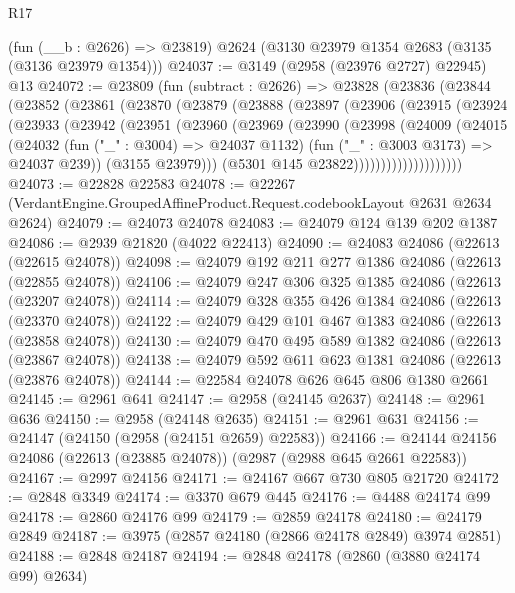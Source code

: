 \begin{lexlean}{R17}
\begin{coremodule}
    (fun (__b : @2626) => @23819)
    @2624
    (@3130 @23979 @1354 @2683 (@3135 (@3136 @23979 @1354)))
@24037 := @3149 (@2958 (@23976 @2727) @22945) @13
@24072 := @23809
    (fun (subtract : @2626) =>
    @23828
      (@23836
        (@23844
          (@23852
            (@23861
              (@23870
                (@23879
                  (@23888
                    (@23897
                      (@23906
                        (@23915
                          (@23924
                            (@23933
                              (@23942
                                (@23951
                                  (@23960
                                    (@23969
                                      (@23990
                                        (@23998
                                          (@24009
                                            (@24015
                                              (@24032
                                                (fun ("_" : @3004) => @24037 @1132)
                                                (fun ("_" : @3003 @3173) => @24037 @239))
                                              (@3155 @23979)))
                                          (@5301 @145 @23822))))))))))))))))))))
@24073 := @22828 @22583
@24078 := @22267 (VerdantEngine.GroupedAffineProduct.Request.codebookLayout @2631 @2634 @2624)
@24079 := @24073 @24078
@24083 := @24079 @124 @139 @202 @1387
@24086 := @2939 @21820 (@4022 @22413)
@24090 := @24083 @24086 (@22613 (@22615 @24078))
@24098 := @24079 @192 @211 @277 @1386 @24086 (@22613 (@22855 @24078))
@24106 := @24079 @247 @306 @325 @1385 @24086 (@22613 (@23207 @24078))
@24114 := @24079 @328 @355 @426 @1384 @24086 (@22613 (@23370 @24078))
@24122 := @24079 @429 @101 @467 @1383 @24086 (@22613 (@23858 @24078))
@24130 := @24079 @470 @495 @589 @1382 @24086 (@22613 (@23867 @24078))
@24138 := @24079 @592 @611 @623 @1381 @24086 (@22613 (@23876 @24078))
@24144 := @22584 @24078 @626 @645 @806 @1380 @2661
@24145 := @2961 @641
@24147 := @2958 (@24145 @2637)
@24148 := @2961 @636
@24150 := @2958 (@24148 @2635)
@24151 := @2961 @631
@24156 := @24147 (@24150 (@2958 (@24151 @2659) @22583))
@24166 := @24144 @24156 @24086 (@22613 (@23885 @24078)) (@2987 (@2988 @645 @2661 @22583))
@24167 := @2997 @24156
@24171 := @24167 @667 @730 @805 @21720
@24172 := @2848 @3349
@24174 := @3370 @679 @445
@24176 := @4488 @24174 @99
@24178 := @2860 @24176 @99
@24179 := @2859 @24178
@24180 := @24179 @2849
@24187 := @3975 (@2857 @24180 (@2866 @24178 @2849) @3974 @2851)
@24188 := @2848 @24187
@24194 := @2848 @24178 (@2860 (@3880 @24174 @99) @2634)

\end{coremodule}
\end{lexlean}
